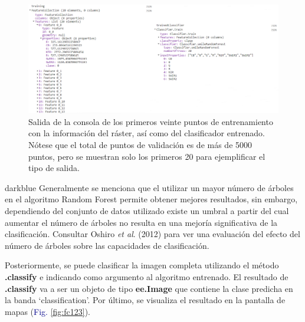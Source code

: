 \documentclass[
  12pt,
  letterpaper,
  twoside]{book}
\newcommand\boldpurple[1]{\textcolor{darkpurple}{\textbf{#1}}}
\begin{document}
\begin{figure}[H]

{\centering \includegraphics[width=0.95\linewidth]{Img/polyTrainConsole} 

}

\caption{Salida de la consola de los primeros veinte puntos de entrenamiento con la información del ráster, así como del clasificador entrenado. Nótese que el total de puntos de validación es de más de 5000 puntos, pero se muestran solo los primeros 20 para ejemplificar el tipo de salida.}\label{fig:fc122}
\end{figure}

\begin{bluebox2}

\begin{awesomeblock}{5pt}{\faLightbulb}{darkblue}
Generalmente se menciona que el utilizar un mayor número de árboles en el algoritmo Random Forest permite obtener mejores resultados, sin embargo, dependiendo del conjunto de datos utilizado existe un umbral a partir del cual aumentar el número de árboles no resulta en una mejoría significativa de la clasificación. Consultar Oshiro \emph{et al}. (2012) para ver una evaluación del efecto del número de árboles sobre las capacidades de clasificación.

\end{awesomeblock}

\end{bluebox2}

Posteriormente, se puede clasificar la imagen completa utilizando el método \boldpurple{.classify} e indicando como argumento al algoritmo entrenado. El resultado de \boldpurple{.classify} va a ser un objeto de tipo \boldpurple{ee.Image} que contiene la clase predicha en la banda `classification'. Por último, se visualiza el resultado en la pantalla de mapas (\textcolor{darkblue}{Fig.} \ref{fig:fc123}).
\end{document}
